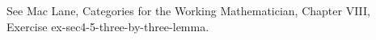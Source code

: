 See Mac Lane, Categories for the Working Mathematician, Chapter VIII, Exercise ex-sec4-5-three-by-three-lemma.
